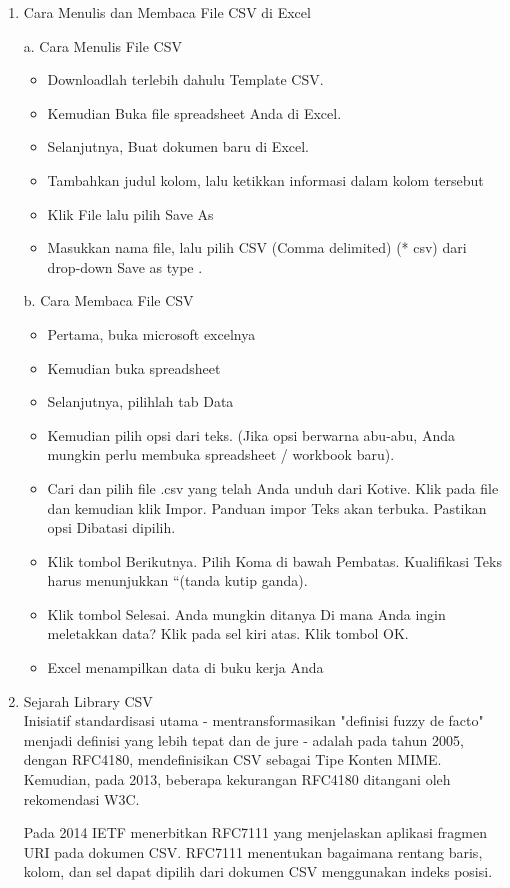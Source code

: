 \begin{enumerate}
\item Cara Menulis dan Membaca File CSV di Excel

a. Cara Menulis File CSV
\begin{itemize}
\item Downloadlah terlebih dahulu Template CSV.
\item Kemudian Buka file spreadsheet Anda di Excel. 
\item Selanjutnya, Buat dokumen baru di Excel.
\item Tambahkan judul kolom, lalu ketikkan informasi dalam kolom tersebut
\item Klik File lalu pilih Save As 
\item Masukkan nama file, lalu pilih CSV (Comma delimited) (* csv) dari drop-down Save as type .
\end{itemize}

b. Cara Membaca File CSV 
\begin{itemize}
\item Pertama, buka microsoft excelnya
\item Kemudian buka spreadsheet
\item Selanjutnya, pilihlah tab Data
\item Kemudian pilih opsi dari teks. (Jika opsi berwarna abu-abu, Anda mungkin perlu membuka spreadsheet / workbook baru).
\item Cari dan pilih file .csv yang telah Anda unduh dari Kotive. Klik pada file dan kemudian klik Impor.
Panduan impor Teks akan terbuka. Pastikan opsi Dibatasi dipilih.
\item Klik tombol Berikutnya. Pilih Koma di bawah Pembatas. Kualifikasi Teks harus menunjukkan “(tanda kutip ganda).
\item Klik tombol Selesai.
Anda mungkin ditanya Di mana Anda ingin meletakkan data? Klik pada sel kiri atas. Klik tombol OK.
\item Excel menampilkan data di buku kerja Anda
\end{itemize}

\item Sejarah Library CSV\\
Inisiatif standardisasi utama - mentransformasikan "definisi fuzzy de facto" menjadi definisi yang lebih tepat dan de jure - adalah pada tahun 2005, dengan RFC4180, mendefinisikan CSV sebagai Tipe Konten MIME. Kemudian, pada 2013, beberapa kekurangan RFC4180 ditangani oleh rekomendasi W3C.

Pada 2014 IETF menerbitkan RFC7111 yang menjelaskan aplikasi fragmen URI pada dokumen CSV. RFC7111 menentukan bagaimana rentang baris, kolom, dan sel dapat dipilih dari dokumen CSV menggunakan indeks posisi.


\end{enumerate}
